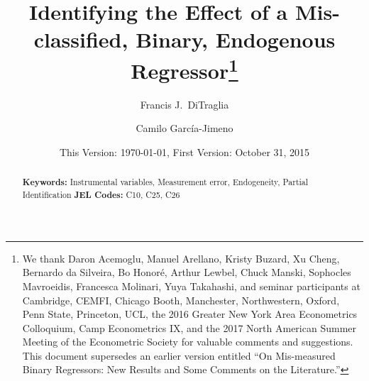 \documentclass[12pt]{article}
\title{Identifying the Effect of a Mis-classified, Binary, Endogenous Regressor\footnote{We thank Daron Acemoglu, Manuel Arellano, Kristy Buzard, Xu Cheng, Bernardo da Silveira, Bo Honor\'{e}, Arthur Lewbel, Chuck Manski, Sophocles Mavroeidis, Francesca Molinari, Yuya Takahashi, and seminar participants at Cambridge, CEMFI, Chicago Booth, Manchester, Northwestern, Oxford, Penn State, Princeton, UCL, the 2016 Greater New York Area Econometrics Colloquium, Camp Econometrics IX, and the 2017 North American Summer Meeting of the Econometric Society for valuable comments and suggestions. This document supersedes an earlier version entitled ``On Mis-measured Binary Regressors: New Results and Some Comments on the Literature.''}}
\author[1]{Francis J.\ DiTraglia}
\author[1,2]{Camilo Garc\'{i}a-Jimeno}
\affil[1]{\normalsize Department of Economics, University of Pennsylvania}
\affil[2]{\normalsize NBER}
\date{\small This Version: \today, First Version: October 31, 2015}
\begin{document}
\maketitle


\begin{abstract}
  \singlespacing
	

  	\bigskip
	\noindent\textbf{Keywords:} Instrumental variables, Measurement error, Endogeneity, Partial Identification
	\medskip
  \noindent\textbf{JEL Codes:} C10, C25, C26
\end{abstract}

\newpage






\appendix
{}
\singlespacing \small


\normalsize


\small


\normalsize
\end{document}
